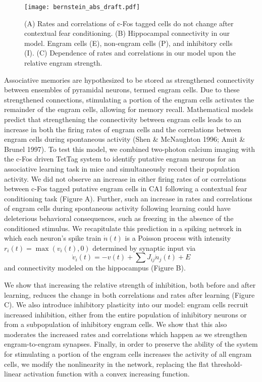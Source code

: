 \documentclass [12pt]{amsart}
\begin{document}
\begin{figure}
\texttt{[image: bernstein\_abs\_draft.pdf]}
\caption{ (A) Rates and correlations of c-Fos tagged cells do not change after contextual fear conditioning. (B) Hippocampal connectivity in our model. Engram cells (E), non-engram cells (P), and inhibitory cells (I). (C) Dependence of rates and correlations in our model upon the relative engram strength. }
\end{figure}
Associative memories are hypothesized to be stored as strengthened connectivity between ensembles of pyramidal neurons, termed engram cells. Due to these strengthened connections, stimulating a portion of the engram cells activates the remainder of the engram cells, allowing for memory recall.  Mathematical models predict that strengthening the connectivity between engram cells leads to an increase in both the firing rates of engram cells and the correlations between engram cells during spontaneous activity (Shen \& McNaughton 1996; Amit \& Brunel 1997).  
To test this model, we combined two-photon calcium imaging with the c-Fos driven TetTag system to identify putative engram neurons for an associative learning task in mice and simultaneously record their population activity. We did not observe an increase in either firing rates of or correlations between c-Fos tagged putative engram cells in CA1 following a contextual fear conditioning task (Figure A). Further, such an increase in rates and correlations of engram cells during spontaneous activity following learning could have deleterious behavioral consequences, such as freezing in the absence of the conditioned stimulus. We recapitulate this prediction in a spiking network in which each neuron’s spike train  $\dot n(t)$ is a Poisson process with intensity $r_i(t) =\max(v_i(t), 0)$ determined by synaptic input via 
$$\dot v_i(t) = -v(t) + \sum J_{ij} \dot n_j(t) + E$$
and connectivity modeled on the hippocampus (Figure B). 

 We show that increasing the relative strength of inhibition, both before and after learning, reduces the change in both correlations and rates after learning (Figure C).  We also introduce inhibitory plasticity into our model: engram cells recruit increased inhibition, either from the entire population of inhibitory neurons or from a subpopulation of inhibitory engram cells. We show that this also moderates the increased rates and correlations which happen as we strengthen engram-to-engram synapses. Finally, in order to preserve the ability of the system for stimulating a portion of the engram cells increases the activity of all engram cells, we modify the nonlinearity in the network, replacing the flat threshold-linear activation function with a convex increasing function. 
\end{document}
